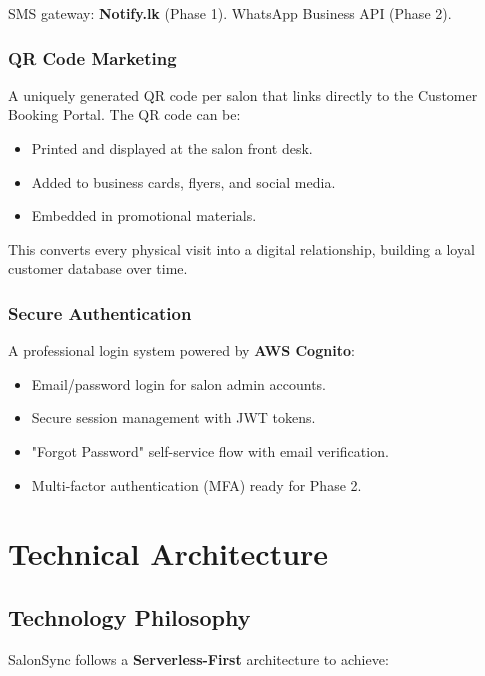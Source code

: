 \documentclass[12pt,a4paper]{report}
\begin{document}
SMS gateway: \textbf{Notify.lk} (Phase 1). WhatsApp Business API (Phase 2).

\subsection{QR Code Marketing}

A uniquely generated QR code per salon that links directly to the Customer Booking
Portal. The QR code can be:

\begin{itemize}[leftmargin=2em]
  \item Printed and displayed at the salon front desk.
  \item Added to business cards, flyers, and social media.
  \item Embedded in promotional materials.
\end{itemize}

This converts every physical visit into a digital relationship, building a loyal
customer database over time.

\subsection{Secure Authentication}

A professional login system powered by \textbf{AWS Cognito}:

\begin{itemize}[leftmargin=2em]
  \item Email/password login for salon admin accounts.
  \item Secure session management with JWT tokens.
  \item "Forgot Password" self-service flow with email verification.
  \item Multi-factor authentication (MFA) ready for Phase 2.
\end{itemize}

\chapter{Technical Architecture}

\section{Technology Philosophy}

SalonSync follows a \textbf{Serverless-First} architecture to achieve:
\end{document}
